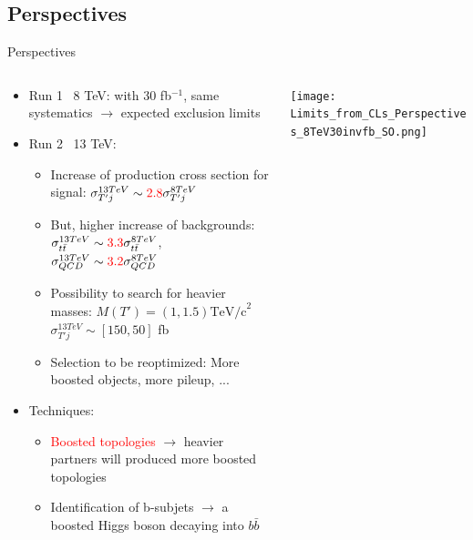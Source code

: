\documentclass[usenames,dvipsnames]{beamer}
\newcommand{\bbbar}{$b\bar{b}$}
\begin{document}
\subsection{Perspectives}
\begin{frame}{Perspectives}

\begin{columns}
\begin{column}{.50\textwidth}
\begin{block}{}
\begin{itemize}\scriptsize
  \item Run 1 \MVAt~8 TeV: with 30 fb$^{-1}$, same systematics $\to$ expected exclusion limits 
  \item Run 2 \MVAt~13 TeV:
    \begin{itemize}\tiny
    \item Increase of production cross section for signal: $\sigma_{T'j}^{13 TeV}\sim \textcolor{red}{2.8}\sigma_{T'j}^{8 TeV}$
    \item But, higher increase of backgrounds: $\sigma^{13 TeV}_{t\bar{t}}\sim \textcolor{red}{3.3}\sigma^{8 TeV}_{t\bar{t}}$, $\sigma^{13 TeV}_{QCD}\sim \textcolor{red}{3.2}\sigma^{8 TeV}_{QCD}$
    \item Possibility to search for heavier masses: $M(T')= (1,1.5) \text{TeV/c}^{2}$  ${\sigma_{T'j}^{13 TeV}\sim [150,50] }$ fb
    \item Selection to be reoptimized: More boosted objects, more pileup, ...
    \end{itemize}
  \item Techniques:
    \begin{itemize}\tiny
    \item \textcolor{red}{Boosted topologies} $\to$ heavier partners will produced more boosted topologies
    \item Identification of b-subjets $\to$ a boosted Higgs boson decaying into \bbbar
    \end{itemize}

\end{itemize}
\end{block}
\end{column}

\begin{column}{.50\textwidth}
\begin{center}
    \texttt{[image: Limits\_from\_CLs\_Perspectives\_8TeV30invfb\_SO.png]}\\
  \end{center}
\end{column}

\end{columns}

\end{frame}
\end{document}

